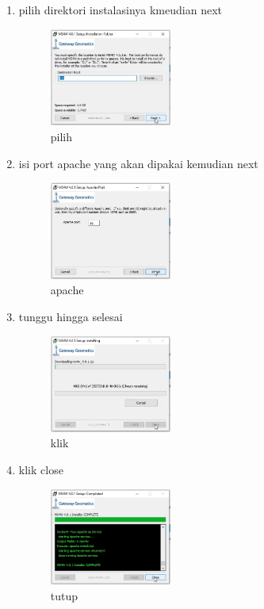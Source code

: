 \begin{enumerate}
 \item pilih direktori instalasinya kmeudian next
   \begin{figure}[H]
		\includegraphics[width=4cm]{figures/1174009/4/5.png}
		\centering
		\caption{pilih}
    \end{figure}

 \item isi port apache yang akan dipakai kemudian next
   \begin{figure}[H]
		\includegraphics[width=4cm]{figures/1174009/4/6.png}
		\centering
		\caption{apache}
    \end{figure}

 \item tunggu hingga selesai
   \begin{figure}[H]
		\includegraphics[width=4cm]{figures/1174009/4/7.png}
		\centering
		\caption{klik}
    \end{figure}

 \item klik close
   \begin{figure}[H]
		\includegraphics[width=4cm]{figures/1174009/4/8.png}
		\centering
		\caption{tutup}
    \end{figure}

\end{enumerate}

